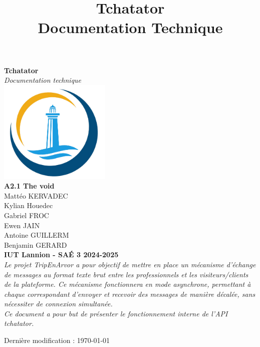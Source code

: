 \documentclass{report}
\title{\Huge Tchatator \\ {\LARGE Documentation Technique}}
\begin{document}
\begin{titlepage}
    \begin{center}
        {\Huge\bfseries Tchatator} \\[1cm]
        {\Large\textit{Documentation technique}} \\[2cm]

        \includegraphics[width=0.4\textwidth]{../../../html/img/logo.png} \\[2cm]

        {\Large \textbf{A2.1 The void}} \\ [.2cm]
        {\large Mattéo KERVADEC } \\[.2cm]
        {\large Kylian Houedec } \\[.2cm]
        {\large Gabriel FROC } \\[.2cm]
        {\large Ewen JAIN } \\[.2cm]
        {\large Antoine GUILLERM } \\[.2cm]
        {\large Benjamin GERARD } \\[1cm]

        \textbf{IUT Lannion - SAÉ 3 2024-2025} \\[1.2cm]

        \textit{
        Le projet TripEnArvor a pour objectif de mettre en place un mécanisme d’échange de messages au format texte brut entre les professionnels et les visiteurs/clients de la plateforme. Ce mécanisme fonctionnera en mode asynchrone, permettant à chaque correspondant d’envoyer et recevoir des messages de manière décalée, sans nécessiter de connexion simultanée. 
		} \\[0.5cm]
		
		\textit{
        Ce document a pour but de présenter le fonctionnement interne de l'API tchatator.
		}

        \vfill  %

        {\small Dernière modification : \today}
    \end{center}
\end{titlepage}
\end{document}
